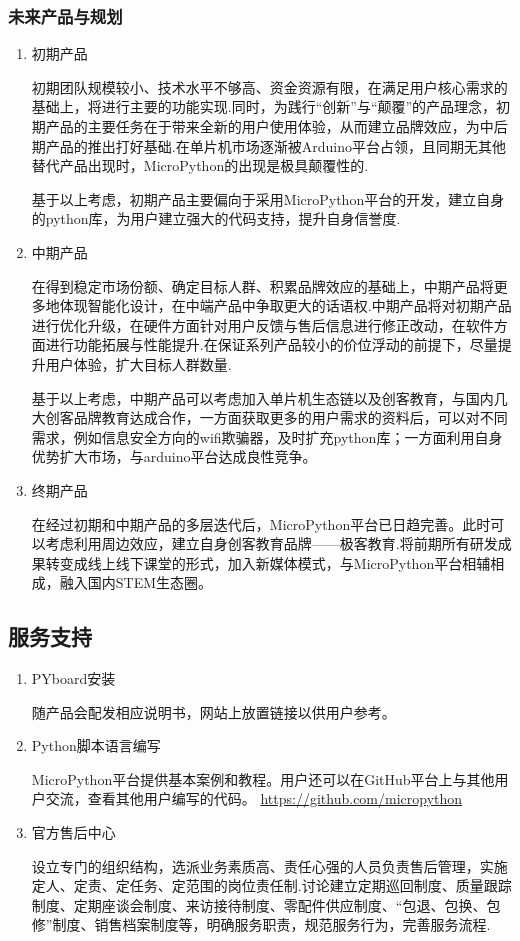 \documentclass[UTF-8,12pt,a4paper]{ctexart}
\begin{document}
\subsubsection{未来产品与规划}
\begin{enumerate}[(1)]

\item 初期产品

      初期团队规模较小、技术水平不够高、资金资源有限，在满足用户核心需求的基础上，将进行主要的功能实现.同时，为践行“创新”与“颠覆”的产品理念，初期产品的主要任务在于带来全新的用户使用体验，从而建立品牌效应，为中后期产品的推出打好基础.在单片机市场逐渐被Arduino平台占领，且同期无其他替代产品出现时，MicroPython的出现是极具颠覆性的.

      基于以上考虑，初期产品主要偏向于采用MicroPython平台的开发，建立自身的python库，为用户建立强大的代码支持，提升自身信誉度.

\item 中期产品

      在得到稳定市场份额、确定目标人群、积累品牌效应的基础上，中期产品将更多地体现智能化设计，在中端产品中争取更大的话语权.中期产品将对初期产品进行优化升级，在硬件方面针对用户反馈与售后信息进行修正改动，在软件方面进行功能拓展与性能提升.在保证系列产品较小的价位浮动的前提下，尽量提升用户体验，扩大目标人群数量.

      基于以上考虑，中期产品可以考虑加入单片机生态链以及创客教育，与国内几大创客品牌教育达成合作，一方面获取更多的用户需求的资料后，可以对不同需求，例如信息安全方向的wifi欺骗器，及时扩充python库；一方面利用自身优势扩大市场，与arduino平台达成良性竞争。

\item 终期产品

      在经过初期和中期产品的多层迭代后，MicroPython平台已日趋完善。此时可以考虑利用周边效应，建立自身创客教育品牌——极客教育.将前期所有研发成果转变成线上线下课堂的形式，加入新媒体模式，与MicroPython平台相辅相成，融入国内STEM生态圈。

\end{enumerate}


\subsection{服务支持}

\begin{enumerate}[(1)]
\item PYboard安装

      随产品会配发相应说明书，网站上放置链接以供用户参考。

\item Python脚本语言编写

      MicroPython平台提供基本案例和教程。用户还可以在GitHub平台上与其他用户交流，查看其他用户编写的代码。
      \url{https://github.com/micropython}

\item 官方售后中心

      设立专门的组织结构，选派业务素质高、责任心强的人员负责售后管理，实施定人、定责、定任务、定范围的岗位责任制.讨论建立定期巡回制度、质量跟踪制度、定期座谈会制度、来访接待制度、零配件供应制度、“包退、包换、包修”制度、销售档案制度等，明确服务职责，规范服务行为，完善服务流程.
\end{enumerate}
\end{document}
